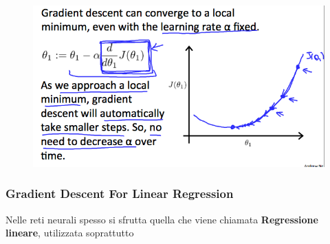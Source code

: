 \begin{figure}[h!]
    \centering
    \includegraphics[width=1\textwidth]{img/RDcJ-KGXEeaVChLw2Vaaug_cb782d34d272321e88f202940c36afe9_Screenshot-2016-11-03-00.06.00.png}
    \caption{}\label{GradientDescent4}
\end{figure}
\subsubsection{Gradient Descent For Linear Regression}
Nelle reti neurali spesso si sfrutta quella che viene chiamata \textbf{Regressione lineare}, utilizzata soprattutto 
